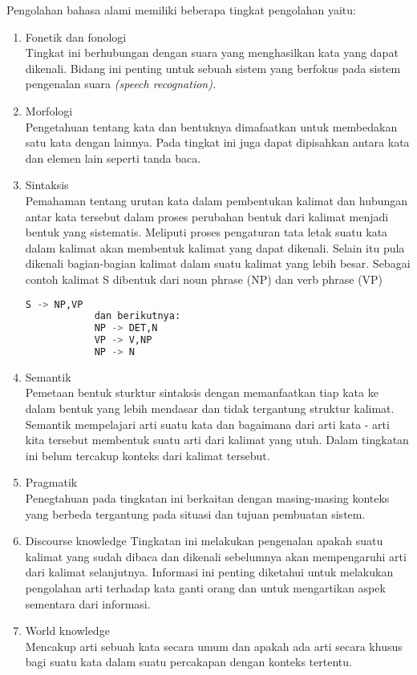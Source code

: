 Pengolahan bahasa alami memiliki beberapa tingkat pengolahan yaitu:
\begin{enumerate}
	\item Fonetik dan fonologi \\
		Tingkat ini berhubungan dengan suara yang menghasilkan kata yang dapat dikenali. Bidang ini penting untuk sebuah sistem yang berfokus pada sistem pengenalan suara \emph{(speech recognation).}
	\item Morfologi \\
		Pengetahuan tentang kata dan bentuknya dimafaatkan untuk membedakan satu kata dengan lainnya. Pada tingkat ini juga dapat dipisahkan antara kata dan elemen lain seperti tanda baca.
	\item Sintaksis \\
		Pemahaman tentang urutan kata dalam pembentukan kalimat dan hubungan antar kata tersebut dalam proses perubahan bentuk dari kalimat menjadi bentuk yang sistematis. Meliputi proses pengaturan tata letak suatu kata dalam kalimat akan membentuk kalimat yang dapat dikenali. Selain itu pula dikenali bagian-bagian kalimat dalam suatu kalimat yang lebih besar. Sebagai contoh kalimat S dibentuk dari noun phrase (NP) dan verb phrase (VP)
		\begin{lstlisting}[language=Python,xleftmargin=0pt]
			S -> NP,VP
			dan berikutnya:
			NP -> DET,N
			VP -> V,NP
			NP -> N
		\end{lstlisting}
	\item Semantik\\
		Pemetaan bentuk sturktur sintaksis dengan memanfaatkan tiap kata ke dalam bentuk yang lebih mendasar dan tidak tergantung struktur kalimat. Semantik mempelajari arti suatu kata dan bagaimana dari arti kata - arti kita tersebut membentuk suatu arti dari kalimat yang utuh. Dalam tingkatan ini belum tercakup konteks dari kalimat tersebut.
	\item Pragmatik\\
		Penegtahuan pada tingkatan ini berkaitan dengan masing-masing konteks yang berbeda tergantung pada situasi dan tujuan pembuatan sistem.
	\item Discourse knowledge
		Tingkatan ini melakukan pengenalan apakah suatu kalimat yang sudah dibaca dan dikenali sebelumnya akan mempengaruhi arti dari kalimat selanjutnya. Informasi ini penting diketahui untuk melakukan pengolahan arti terhadap kata ganti orang dan untuk mengartikan aspek sementara dari informasi.
	\item World knowledge\\
		Mencakup arti sebuah kata secara umum dan apakah ada arti secara khusus bagi suatu kata dalam suatu percakapan dengan konteks tertentu.
\end{enumerate}

